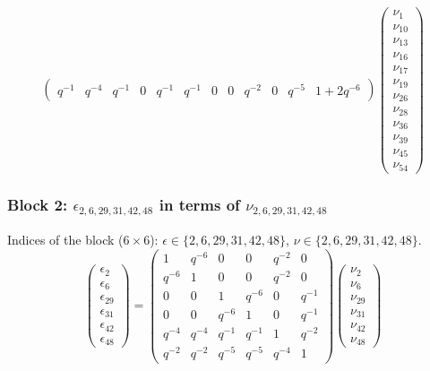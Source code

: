 \[\begin{pmatrix}
q^{-1} & q^{-4} & q^{-1} & 0 & q^{-1} & q^{-1} & 0 & 0 & q^{-2} & 0 & q^{-5} & 1+2q^{-6}
\end{pmatrix}
\begin{pmatrix}
\nu_{1} \\
\nu_{10} \\
\nu_{13} \\
\nu_{16} \\
\nu_{17} \\
\nu_{19} \\
\nu_{26} \\
\nu_{28} \\
\nu_{36} \\
\nu_{39} \\
\nu_{45} \\
\nu_{54}
\end{pmatrix}
\]

\subsubsection{Block 2: $\epsilon_{2, 6, 29, 31, 42, 48}$ in terms of $\nu_{2, 6, 29, 31, 42, 48}$}
Indices of the block ($6\times 6$): $\epsilon \in \{2, 6, 29, 31, 42, 48\}$, $\nu \in \{2, 6, 29, 31, 42, 48\}$.
\[
\begin{pmatrix}
\epsilon_{2} \\
\epsilon_{6} \\
\epsilon_{29} \\
\epsilon_{31} \\
\epsilon_{42} \\
\epsilon_{48}
\end{pmatrix}
=
\begin{pmatrix}
1 & q^{-6} & 0 & 0 & q^{-2} & 0 \\
q^{-6} & 1 & 0 & 0 & q^{-2} & 0 \\
0 & 0 & 1 & q^{-6} & 0 & q^{-1} \\
0 & 0 & q^{-6} & 1 & 0 & q^{-1} \\
q^{-4} & q^{-4} & q^{-1} & q^{-1} & 1 & q^{-2} \\
q^{-2} & q^{-2} & q^{-5} & q^{-5} & q^{-4} & 1
\end{pmatrix}
\begin{pmatrix}
\nu_{2} \\
\nu_{6} \\
\nu_{29} \\
\nu_{31} \\
\nu_{42} \\
\nu_{48}
\end{pmatrix}
\]

